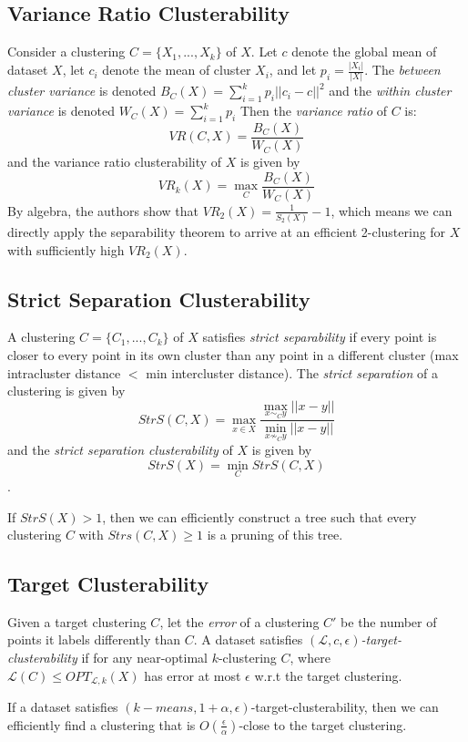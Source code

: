     \subsection*{Variance Ratio Clusterability}
    Consider a clustering $C=\{X_1,...,X_k\}$ of $X$. Let $c$ denote the global mean of dataset $X$, let $c_i$ denote the mean of cluster $X_i$, and let $p_i=\frac{|X_i|}{|X|}$. The \textit{between cluster variance} is denoted $B_C(X) = \sum_{i=1}^k p_i||c_i-c||^2$ and the \textit{within cluster variance} is denoted $W_C(X) = \sum_{i=1}^k p_i$ Then the \textit{variance ratio} of $C$ is:
    $$VR(C,X) = \frac{B_C(X)}{W_C(X)}$$
    and the variance ratio clusterability of $X$ is given by
    $$VR_k(X) = \max_{C} \frac{B_C(X)}{W_C(X)}$$
    By algebra, the authors show that $VR_2(X) = \frac{1}{S_2(X)}-1$, which means we can directly apply the separability theorem to arrive at an efficient 2-clustering for $X$ with sufficiently high $VR_2(X)$.
    
    \subsection*{Strict Separation Clusterability}
    A clustering $C = \{C_1,...,C_k\}$ of $X$ satisfies \textit{strict separability} if every point is closer to every point in its own cluster than any point in a different cluster (max intracluster distance $<$ min intercluster distance). The \textit{strict separation} of a clustering is given by
    $$StrS(C,X) = \max_{x\in X}\frac{\max_{x  \sim_C y} ||x-y||}{\min_{x \not\sim_C y} ||x-y||}$$
    and the \textit{strict separation clusterability} of $X$ is given by
    $$StrS(X) = \min_C StrS(C,X)$$. 
    \begin{theorem}
    If $StrS(X)>1$, then we can efficiently construct a tree such that every clustering $C$ with $Strs(C,X)\geq 1$ is a pruning of this tree.
    \end{theorem}
    
    \subsection*{Target Clusterability}
    Given a target clustering $C$, let the \textit{error} of a clustering $C'$ be the number of points it labels differently than $C$. A dataset satisfies \textit{$(\mathcal{L},c,\epsilon)$-target-clusterability} if for any near-optimal $k$-clustering $C$, where $\mathcal{L}(C)\leq OPT_{\mathcal{L},k}(X)$ has error at most $\epsilon$ w.r.t the target clustering.
    \begin{theorem}
    If a dataset satisfies $(k-means, 1+\alpha, \epsilon)$-target-clusterability, then we can efficiently find a clustering that is $O(\frac{\epsilon}{\alpha})$-close to the target clustering.
    \end{theorem}
    
